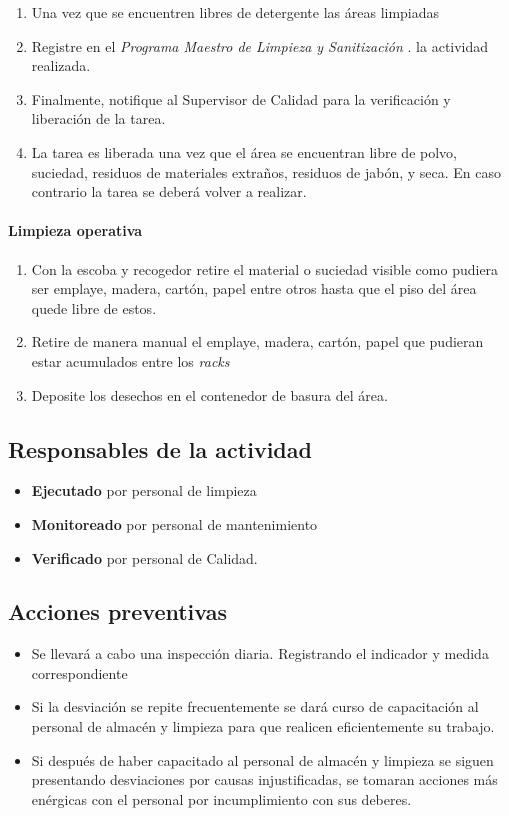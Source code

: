 \begin{enumerate}
    \item Una vez que se encuentren libres de detergente las áreas limpiadas
    \item Registre en el \emph{Programa Maestro de Limpieza y Sanitización} \RAC. la actividad realizada.
    \item Finalmente, notifique al Supervisor de Calidad para la verificación y liberación de la tarea.
    \item La tarea es liberada una vez que el área se encuentran libre de polvo, suciedad, residuos de materiales extraños, residuos de jabón, y seca. En caso contrario la tarea se deberá volver a realizar.
\end{enumerate}

\paragraph{Limpieza operativa}

\begin{enumerate}
    \item Con la escoba y recogedor retire el material o suciedad visible como pudiera ser emplaye, madera, cartón, papel entre otros hasta que el piso del área quede libre de estos.
    \item Retire de manera manual el emplaye, madera, cartón, papel que pudieran estar acumulados entre los \textit{racks}
    \item Deposite los desechos en el contenedor de basura del área.
\end{enumerate}

\subsection{Responsables de la actividad}

\begin{itemize}
    \item \textbf{Ejecutado} por personal de limpieza
    \item \textbf{Monitoreado} por personal de mantenimiento
    \item \textbf{Verificado} por personal de Calidad.
\end{itemize}

\subsection{Acciones preventivas}

\begin{itemize}
    \item Se llevará a cabo una inspección diaria. Registrando el indicador y medida correspondiente
    \item Si la desviación se repite frecuentemente se dará curso de capacitación al personal de almacén y limpieza para que realicen eficientemente su trabajo.
    \item Si después de haber capacitado al personal de almacén y limpieza se siguen presentando desviaciones por causas injustificadas, se tomaran acciones más enérgicas con el personal por incumplimiento con sus deberes.
\end{itemize}

